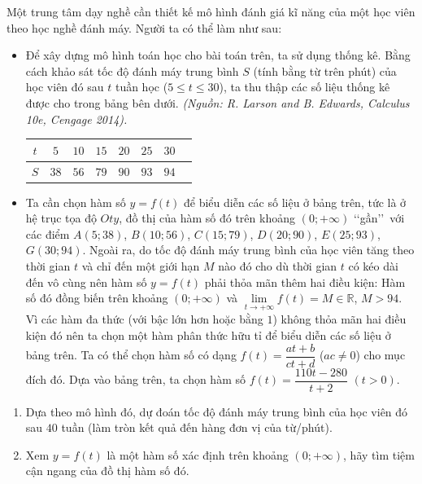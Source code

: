 \begin{bt}%
	Một trung tâm dạy nghề cần thiết kế mô hình đánh giá kĩ năng của một học viên theo học nghề đánh máy. Người ta có thể làm như sau:
	\begin{itemize}
		\item Để xây dựng mô hình toán học cho bài toán trên, ta sử dụng thống kê. Bằng cách khảo sát tốc độ đánh máy trung bình $S$ (tính bằng từ trên phút) của học viên đó sau $t$ tuần học ($5\leq t\leq 30$), ta thu thập các số liệu thống kê được cho trong bảng bên dưới. \textit{(Nguồn: R. Larson and B. Edwards, Calculus 10e, Cengage 2014).}
		\begin{center}
			\begin{tabular}{|c|c|c|c|c|c|c|c|}
				\hline
				$t$ & $5$ & $10$ & $15$ & $20$ & $25$ & $30$\\
				\hline
				$S$ & $38$ & $56$ & $79$ & $90$ & $93$ & $94$\\
				\hline
			\end{tabular}
		\end{center}
		\item Ta cần chọn hàm số $y=f(t)$ để biểu diễn các số liệu ở bảng trên, tức là ở hệ trục tọa độ $Oty$, đồ thị của hàm số đó trên khoảng $(0;+\infty)$ \lq\lq gần\rq\rq\ với các điểm $A(5;38)$, $B(10;56)$, $C(15;79)$, $D(20;90)$, $E(25;93)$, $G(30;94)$. Ngoài ra, do tốc độ đánh máy trung bình của học viên tăng theo thời gian $t$ và chỉ đến một giới hạn $M$ nào đó cho dù thời gian $t$ có kéo dài đến vô cùng nên hàm số $y=f(t)$ phải thỏa mãn thêm hai điều kiện: Hàm số đó đồng biến trên khoảng $(0;+\infty)$ và $\lim\limits_{t\to +\infty}f(t)=M\in\mathbb{R}$, $M>94$. Vì các hàm đa thức (với bậc lớn hơn hoặc bằng $1$) không thỏa mãn hai điều kiện đó nên ta chọn một hàm phân thức hữu tỉ để biểu diễn các số liệu ở bảng trên. Ta có thể chọn hàm số có dạng $f(t)=\dfrac{at+b}{ct+d}$ ($ac\neq 0$) cho mục đích đó. Dựa vào bảng trên, ta chọn hàm số $f(t)=\dfrac{110t-280}{t+2}$ $(t>0)$.
	\end{itemize}
	\begin{enumerate}
		\item Dựa theo mô hình đó, dự đoán tốc độ đánh máy trung bình của học viên đó sau $40$ tuần (làm tròn kết quả đến hàng đơn vị của từ/phút).
		\item Xem $y=f(t)$ là một hàm số xác định trên khoảng $(0;+\infty)$, hãy tìm tiệm cận ngang của đồ thị hàm số đó.

\end{enumerate}
\end{bt}
